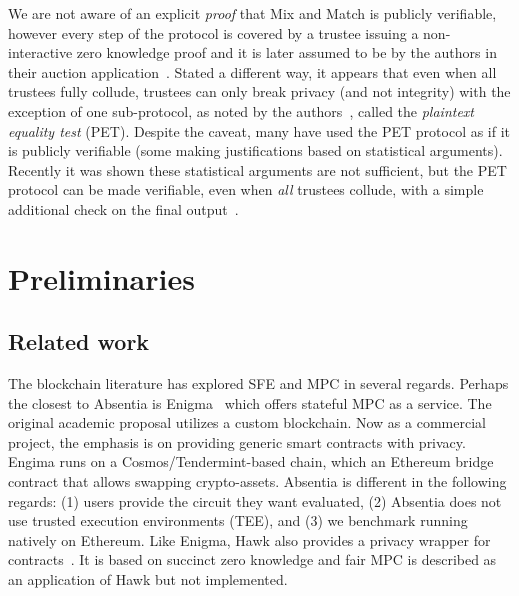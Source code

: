 We are not aware of an explicit \emph{proof} that Mix and Match is publicly verifiable, however every step of the protocol is covered by a trustee issuing a non-interactive zero knowledge proof and it is later assumed to be by the authors in their auction application~\cite{JJ00}. Stated a different way, it appears that even when all trustees fully collude, trustees can only break privacy (and not integrity) with the exception of one sub-protocol, as noted by the authors~\cite{JJ00}, called the \emph{plaintext equality test} (PET). Despite the caveat, many have used the PET protocol as if it is publicly verifiable (some making justifications based on statistical arguments). Recently it was shown these statistical arguments are not sufficient, but the PET protocol can be made verifiable, even when \emph{all} trustees collude, with a simple additional check on the final output~\cite{mcmurtry2020test}.


\section{Preliminaries}


\subsection{Related work}
\label{sec:lit}

The blockchain literature has explored SFE and MPC in several regards. Perhaps the closest to Absentia is Enigma~\cite{zyskind2015enigma} which offers stateful MPC as a service. The original academic proposal utilizes a custom blockchain. Now as a commercial project, the emphasis is on providing generic smart contracts with privacy. Engima runs on a Cosmos/Tendermint-based chain, which an Ethereum bridge contract that allows swapping crypto-assets. Absentia is different in the following regards: (1) users provide the circuit they want evaluated, (2) Absentia does not use trusted execution environments (TEE), and (3) we benchmark running natively on Ethereum. Like Enigma, Hawk also provides a privacy wrapper for contracts~\cite{kosba2016hawk}. It is based on succinct zero knowledge and fair MPC is described as an application of Hawk but not implemented.  


